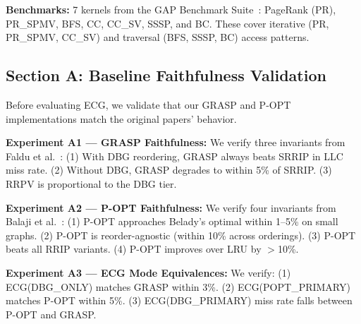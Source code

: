 \documentclass[conference]{IEEEtran}
\begin{document}
\begin{scriptsize}
\begin{table}[t]
\centering
\caption{Graph workloads used in ECG evaluation}
\label{table:graph}
\end{table}
\end{scriptsize}

\textbf{Benchmarks:} 7 kernels from the GAP Benchmark Suite~\cite{beamer_gap_2017}: PageRank (PR), PR\_SPMV, BFS, CC, CC\_SV, SSSP, and BC. These cover iterative (PR, PR\_SPMV, CC\_SV) and traversal (BFS, SSSP, BC) access patterns.

\subsection{Section A: Baseline Faithfulness Validation}

Before evaluating ECG, we validate that our GRASP and P-OPT implementations match the original papers' behavior.

\textbf{Experiment A1 --- GRASP Faithfulness:} We verify three invariants from Faldu et al.~\cite{faldu_domain-specialized_2020}: (1) With DBG reordering, GRASP always beats SRRIP in LLC miss rate. (2) Without DBG, GRASP degrades to within 5\% of SRRIP. (3) RRPV is proportional to the DBG tier.

\textbf{Experiment A2 --- P-OPT Faithfulness:} We verify four invariants from Balaji et al.~\cite{balaji_p-opt_2021}: (1) P-OPT approaches Belady's optimal within 1--5\% on small graphs. (2) P-OPT is reorder-agnostic (within 10\% across orderings). (3) P-OPT beats all RRIP variants. (4) P-OPT improves over LRU by $>$10\%.

\textbf{Experiment A3 --- ECG Mode Equivalences:} We verify: (1) ECG(DBG\_ONLY) matches GRASP within 3\%. (2) ECG(POPT\_PRIMARY) matches P-OPT within 5\%. (3) ECG(DBG\_PRIMARY) miss rate falls between P-OPT and GRASP.
\end{document}
